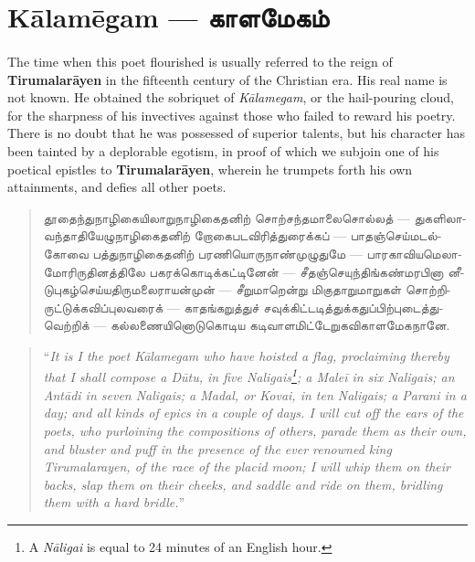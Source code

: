 \documentclass{article}
\newcommand{\TamilText}[1]{\texttamil{#1}}
\newcommand{\TamilBold}[1]{\texttamil{\textbf{#1}}}
\newcommand{\tam}[1]{\TamilText{#1}}
\newcommand{\tambold}[1]{\TamilBold{#1}}
\begin{document}
\section{K\={a}lam\={e}gam --- \tambold{காளமேகம்}}
\paragraph{}
The time when this poet flourished is usually referred to the reign of \textbf{Tirumalar\={a}yen} in the fifteenth century of the Christian era. His real name is not known. He obtained the sobriquet of \emph{K\={a}lamegam}, or the hail-pouring cloud, for the sharpness of his invectives against those who failed to reward his poetry. There is no doubt that he was possessed of superior talents, but his character has been tainted by a deplorable egotism, in proof of which we subjoin one of his poetical epistles to \textbf{Tirumalar\={a}yen}, wherein he trumpets forth his own attainments, and defies all other poets.
\begin{quotation}\small
\tam{தூதைந்துநாழிகையிலாறுநாழிகைதனிற்‌ சொற்சந்தமாலைசொல்‌லத்‌} --- \tam{துகளிலாவந்தாதியேழுநாழிகைதனிற்‌ றோகைபடவிரித்துரைக்கப்} --- \tam{பாதஞ்செய்மடல்கோவை பத்துநாழிகைதனிற்‌ பரணியொருநாண்முழுதுமே} --- \tam{பாரகாவியமெலாமோரிருதினத்திலே பகரக்கொடிக்கட்டினேன்‌} --- \tam{சீதஞ்செயுந்திங்கண்மரபினா னீடுபுகழ்செய்யதிருமலைராயன்‌முன்‌} --- \tam{சீறுமாறென்று மிகுதாறுமாறுகள்‌ சொற்றிருட்டுக்கவிப்புலவரைக்‌} --- \tam{காதங்கறுத்துச்‌ சவுக்கிட்டடித்துக்கதுப்பிற்புடைத்துவெற்றிக்} --- \tam{கல்லணையினொடுகொடிய கடிவாளமிட்டேறுகவிகாளமேகநானே}.
\end{quotation}
\begin{quotation}\small
``\emph{It is I the poet K\={a}lamegam who have hoisted a flag, proclaiming thereby that I shall compose a D\={u}tu, in five Naligais\footnote{A \emph{N\={a}ligai} is equal to 24 minutes of an English hour.}; a Male\={i} in six Naligais; an Ant\={a}di in seven Naligais; a Madal, or Kovai, in ten Naligais; a Parani in a day; and all kinds of epics in a couple of days. I will cut off the ears of the poets, who purloining the compositions of others, parade them as their own, and bluster and puff in the presence of the ever renowned king Tirumalarayen, of the race of the placid moon; I will whip them on their backs, slap them on their cheeks, and saddle and ride on them, bridling them with a hard bridle.}''
\end{quotation}
\end{document}
